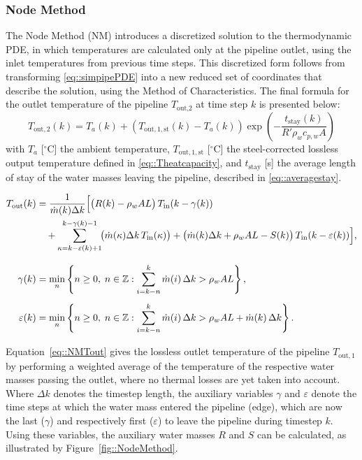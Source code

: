\subsubsection{Node Method}\label{sec::NodeMethod}
The Node Method (NM) introduces a discretized solution to the thermodynamic PDE, in which temperatures are calculated only at the pipeline outlet, using the inlet temperatures from previous time steps. This discretized form follows from transforming \eqref{eq::simpipePDE} into a new reduced set of coordinates that describe the solution, using the Method of Characteristics. The final formula for the outlet temperature of the pipeline $T_{\text{out,2}}$ at time step $k$ is presented below:
\begin{equation}\label{eq::NMfinaleq}
    T_{\mathrm{out},2}(k) = T_a(k) + \left(T_{\mathrm{out},1,\mathrm{st}}(k)
    - T_a(k)\right)\exp\!\left(-\frac{t_{\mathrm{stay}}(k)}{R'\rho_w c_{p,w} A}\right)
\end{equation}
with $T_a$ [$^{\circ}$C] the ambient temperature, $T_{\mathrm{out},1,\mathrm{st}}$ [$^{\circ}$C] the steel-corrected lossless output temperature defined in \eqref{eq::Theatcapacity}, and $t_{\text{stay}}$ [s] the average length of stay of the water masses leaving the pipeline, described in \eqref{eq::averagestay}.

\begin{subequations}\label{eq::NodeMethod}
\centering
\begin{align} 
T_{\mathrm{out}}(k) &= \frac{1}{\dot{m}(k)\Delta k}
    \Bigl[\bigl(R(k) - \rho_w A L\bigr)\,T_{\mathrm{in}}(k-\gamma(k)) \notag \\
&\quad + \sum_{\kappa=k-\varepsilon(k)+1}^{k-\gamma(k)-1}
    \!\bigl(\dot{m}(\kappa)\Delta k\,T_{\mathrm{in}}(\kappa)\bigr)
  + \bigl(\dot{m}(k)\Delta k + \rho_w A L - S(k)\bigr)\,
    T_{\mathrm{in}}(k-\varepsilon(k))\Bigr], \label{eq::NMTout} \\[8pt]
\gamma(k) &= \min_{n} \left\{ n \geq 0,\; n \in \mathbb{Z} : 
    \sum_{i=k-n}^{k} \dot{m}(i)\,\Delta k > \rho_w A L \right\}, 
    \label{eq::gammadelay} \\[4pt]
\varepsilon(k) &= \min_{n} \left\{ n \geq 0,\; n \in \mathbb{Z} : 
    \sum_{i=k-n}^{k} \dot{m}(i)\,\Delta k > \rho_w A L + \dot{m}(k)\,\Delta k \right\}.
    \label{eq::epsilondelay}
\end{align}
\end{subequations}

Equation~\eqref{eq::NMTout} gives the lossless outlet temperature of the pipeline $T_{\mathrm{out,1}}$ by performing a weighted average of the temperature of the respective water masses passing the outlet, where no thermal losses are yet taken into account. Where $\Delta k$ denotes the timestep length, the auxiliary variables $\gamma$  and $\varepsilon$ denote the time steps at which the water mass entered the pipeline (edge), which are now the last ($\gamma$) and respectively first ($\varepsilon$) to leave the pipeline during timestep $k$. Using these variables, the auxiliary water masses $R$ and $S$ can be calculated, as illustrated by Figure~\ref{fig::NodeMethod}.

